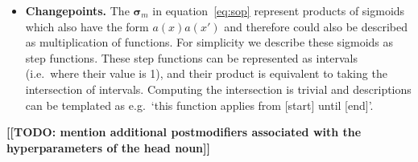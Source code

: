 \documentclass[letterpaper]{article}
\def\ie{i.e.\ }
\def\eg{e.g.\ }
\begin{document}
\begin{itemize}

\item {\bf Changepoints.}
The $\boldsymbol\sigma_m$ in equation~\eqref{eq:sop} represent products of sigmoids which also have the form $a(x)a(x')$ and therefore could also be described as multiplication of functions.
For simplicity we describe these sigmoids as step functions\footnotemark.
These step functions can be represented as intervals (\ie where their value is 1), and their product is equivalent to taking the intersection of intervals.
Computing the intersection is trivial and descriptions can be templated as \eg `this function applies from [start] until [end]'.


\end{itemize}

{\bf [[TODO: mention additional postmodifiers associated with the hyperparameters of the head noun]]}

\end{document}
